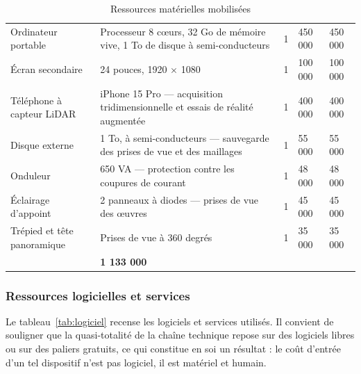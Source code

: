 \begin{table}[htbp]
\centering
\caption{Ressources matérielles mobilisées}
\label{tab:materiel}
\small
\begin{tabularx}{\textwidth}{|L{3.2cm}|X|C{1.3cm}|R{2.0cm}|R{2.0cm}|}
\hline
{}
 &  &  &  &  \\ \hline
Ordinateur portable & Processeur 8 cœurs, 32 Go de mémoire vive, 1 To de disque à semi-conducteurs & 1 & 450 000 & 450 000 \\ \hline
Écran secondaire & 24 pouces, 1920 $\times$ 1080 & 1 & 100 000 & 100 000 \\ \hline
Téléphone à capteur LiDAR & iPhone 15 Pro — acquisition tridimensionnelle et essais de réalité augmentée & 1 & 400 000 & 400 000 \\ \hline
Disque externe & 1 To, à semi-conducteurs — sauvegarde des prises de vue et des maillages & 1 & 55 000 & 55 000 \\ \hline
Onduleur & 650 VA — protection contre les coupures de courant & 1 & 48 000 & 48 000 \\ \hline
Éclairage d'appoint & 2 panneaux à diodes — prises de vue des œuvres & 1 & 45 000 & 45 000 \\ \hline
Trépied et tête panoramique & Prises de vue à 360 degrés & 1 & 35 000 & 35 000 \\ \hline
{}
 & \textbf{1 133 000} \\ \hline
\end{tabularx}
\end{table}

\subsubsection{Ressources logicielles et services}

Le tableau~\ref{tab:logiciel} recense les logiciels et services utilisés. Il
convient de souligner que la quasi-totalité de la chaîne technique repose sur
des logiciels libres ou sur des paliers gratuits, ce qui constitue en soi un
résultat : le coût d'entrée d'un tel dispositif n'est pas logiciel, il est
matériel et humain.

